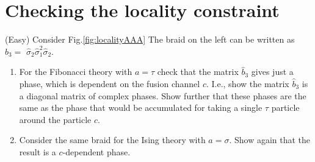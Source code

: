 \documentclass{book}
\begin{document}
\section{Checking the locality constraint}
(Easy) Consider Fig.\ref{fig:localityAAA} The braid on the left can be written as $\hat{b}_{3} =$ $\hat{\sigma }_{2}\hat{\sigma }_{1}^{2}\hat{\sigma }_{2}$.
\begin{enumerate}
\item For the Fibonacci theory with $a=\tau $ check that the matrix $\hat{b}_{3}$ gives just a phase, which is dependent on the fusion channel $c$. I.e., show the matrix $\hat{b}_{3}$ is a diagonal matrix of complex phases. Show further that these phases are the same as the phase that would be accumulated for taking a single $\tau $ particle around the particle $c$.
\item Consider the same braid for the Ising theory with $a=\sigma $. Show again that the result is a $c$-dependent phase.
\end{enumerate}
\end{document}
